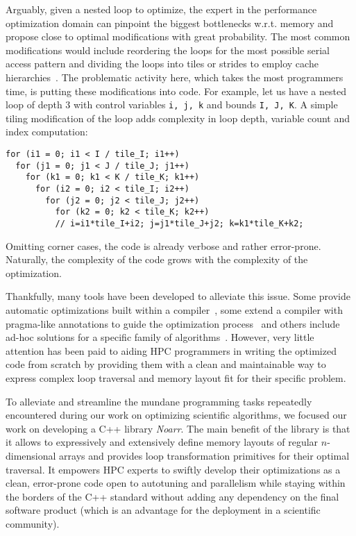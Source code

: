 Arguably, given a nested loop to optimize, the expert in the performance optimization domain can pinpoint the biggest bottlenecks w.r.t. memory and propose close to optimal modifications with great probability. The most common modifications would include reordering the loops for the most possible serial access pattern and dividing the loops into tiles or strides to employ cache hierarchies~\cite{wolf1991data}. The problematic activity here, which takes the most programmers time, is putting these modifications into code. For example, let us have a nested loop of depth 3 with control variables \texttt{i, j, k} and bounds \texttt{I, J, K}. A simple tiling modification of the loop adds complexity in loop depth, variable count and index computation: 
\begin{verbatim}
for (i1 = 0; i1 < I / tile_I; i1++)
  for (j1 = 0; j1 < J / tile_J; j1++)
    for (k1 = 0; k1 < K / tile_K; k1++)
      for (i2 = 0; i2 < tile_I; i2++)
        for (j2 = 0; j2 < tile_J; j2++)
          for (k2 = 0; k2 < tile_K; k2++)
          // i=i1*tile_I+i2; j=j1*tile_J+j2; k=k1*tile_K+k2;
\end{verbatim}
Omitting corner cases, the code is already verbose and rather error-prone. Naturally, the complexity of the code grows with the complexity of the optimization.

Thankfully, many tools have been developed to alleviate this issue. Some provide automatic optimizations built within a compiler~\cite{trifunovic2010graphite,grosser2012polly}, some extend a compiler with pragma-like annotations to guide the optimization process~\cite{donadio2005language,yi2007poet,chen2008chill,namjoshi2016loopy} and others include ad-hoc solutions for a specific family of algorithms~\cite{9485033,AFANASYEV2021100707}. However, very little attention has been paid to aiding HPC programmers in writing the optimized code from scratch by providing them with a clean and maintainable way to express complex loop traversal and memory layout fit for their specific problem.

To alleviate and streamline the mundane programming tasks repeatedly encountered during our work on optimizing scientific algorithms, we focused our work on developing a C++ library \emph{Noarr}. The main benefit of the library is that it allows to expressively and extensively define memory layouts of regular $n$-dimensional arrays and provides loop transformation primitives for their optimal traversal. It empowers HPC experts to swiftly develop their optimizations as a clean, error-prone code open to autotuning and parallelism while staying within the borders of the C++ standard without adding any dependency on the final software product (which is an advantage for the deployment in a scientific community).

